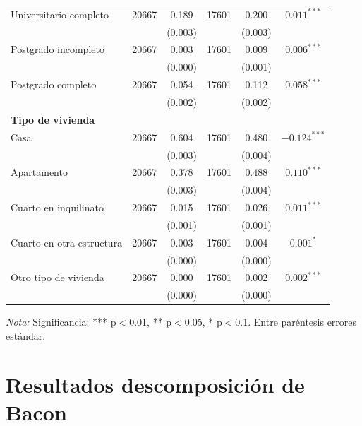 \documentclass{article}
\begin{document}
\begin{table}[H]
\begin{tabular}{l c c c c c}
    Universitario completo & 20667 & 0.189 & 17601 & 0.200 & $0.011^{***}$ \\
     & & (0.003) & & (0.003) & \\
    Postgrado incompleto & 20667 & 0.003 & 17601 & 0.009 & $0.006^{***}$ \\
     & & (0.000) & & (0.001) & \\
    Postgrado completo & 20667 & 0.054 & 17601 & 0.112 & $0.058^{***}$ \\
     & & (0.002) & & (0.002) & \\
    \midrule
    \textbf{Tipo de vivienda} & & & & & \\
    Casa & 20667 & 0.604 & 17601 & 0.480 & $-0.124^{***}$ \\
     & & (0.003) & & (0.004) & \\
    Apartamento & 20667 & 0.378 & 17601 & 0.488 & $0.110^{***}$ \\
     & & (0.003) & & (0.004) & \\
    Cuarto en inquilinato & 20667 & 0.015 & 17601 & 0.026 & $0.011^{***}$ \\
     & & (0.001) & & (0.001) & \\
    Cuarto en otra estructura & 20667 & 0.003 & 17601 & 0.004 & $0.001^{*}$ \\
     & & (0.000) & & (0.000) & \\
    Otro tipo de vivienda & 20667 & 0.000 & 17601 & 0.002 & $0.002^{***}$ \\
     & & (0.000) & & (0.000) & \\
    \bottomrule
  \end{tabular}
  \parbox[t]{\textwidth}{%
    \vspace{0.5em}
    \footnotesize{\textit{Nota:} Significancia: *** p$<$0.01, ** p$<$0.05, * p$<$0.1. Entre paréntesis errores estándar.}}
\end{table}

\section{Resultados descomposición de Bacon}
\label{sec:resultados_bacon}
\end{document}
